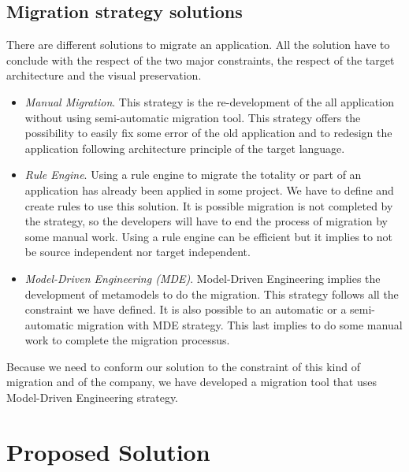 \documentclass[conference]{IEEEtran}
\begin{document}
\subsection{Migration strategy solutions}

There are different solutions to migrate an application.
All the solution have to conclude with the respect of the two major constraints, 
    the respect of the target architecture and the visual preservation.

\begin{itemize}
    
    \item \emph{Manual Migration}. This strategy is the re-development of the all application
        without using semi-automatic migration tool.
    This strategy offers the possibility to easily fix some error of the old application and to 
        redesign the application following architecture principle of the target language. %

    \item \emph{Rule Engine}. Using a rule engine to migrate the totality or part of an application has
            already been applied in some project. %
        We have to define and create rules to use this solution.
        It is possible migration is not completed by the strategy, so the developers will have to
            end the process of migration by some manual work.
        Using a rule engine can be efficient but it implies to not be source independent nor target independent.

    \item \emph{Model-Driven Engineering (MDE)}. Model-Driven Engineering implies the development of metamodels
        to do the migration.
        This strategy follows all the constraint we have defined.
        It is also possible to an automatic or a semi-automatic migration with MDE strategy.
        This last implies to do some manual work to complete the migration processus.

\end{itemize}

Because we need to conform our solution to the constraint of this kind of migration
    and of the company, we have developed a migration tool that uses Model-Driven Engineering strategy. 

\section{Proposed Solution}
\label{sec:contribution}
\end{document}
